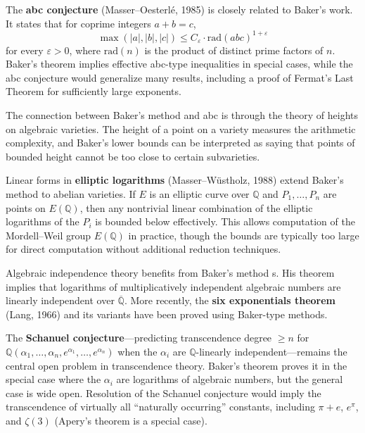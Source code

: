 The \textbf{abc conjecture} (Masser--Oesterl\'e, 1985) is closely related to Baker's work. It states that for coprime integers $a + b = c$,
\[
\max(|a|, |b|, |c|) \leq C_\varepsilon \cdot \text{rad}(abc)^{1+\varepsilon}
\]
for every $\varepsilon > 0$, where $\text{rad}(n)$ is the product of distinct prime factors of $n$. Baker's theorem implies effective abc-type inequalities in special cases, while the abc conjecture would generalize many results, including a proof of Fermat's Last Theorem for sufficiently large exponents.

The connection between Baker's method \cite{baker1966} and abc is through the theory of heights on algebraic varieties. The height of a point on a variety measures the arithmetic complexity, and Baker's lower bounds can be interpreted as saying that points of bounded height cannot be too close to certain subvarieties.

Linear forms in \textbf{elliptic logarithms} (Masser--W\"{u}stholz, 1988) extend Baker's method \cite{baker1966} to abelian varieties. If $E$ is an elliptic curve over $\mathbb{Q}$ and $P_1, \ldots, P_n$ are points on $E(\mathbb{Q})$, then any nontrivial linear combination of the elliptic logarithms of the $P_i$ is bounded below effectively. This allows computation of the Mordell--Weil group $E(\mathbb{Q})$ in practice, though the bounds are typically too large for direct computation without additional reduction techniques.

Algebraic independence theory benefits from Baker's method \cite{baker1966}s. His theorem implies that logarithms of multiplicatively independent algebraic numbers are linearly independent over $\overline{\mathbb{Q}}$. More recently, the \textbf{six exponentials theorem} (Lang, 1966) and its variants have been proved using Baker-type methods.

The \textbf{Schanuel conjecture}---predicting transcendence degree $\geq n$ for $\mathbb{Q}(\alpha_1, \ldots, \alpha_n, e^{\alpha_1}, \ldots, e^{\alpha_n})$ when the $\alpha_i$ are $\mathbb{Q}$-linearly independent---remains the central open problem in transcendence theory. Baker's theorem proves it in the special case where the $\alpha_i$ are logarithms of algebraic numbers, but the general case is wide open. Resolution of the Schanuel conjecture would imply the transcendence of virtually all ``naturally occurring'' constants, including $\pi + e$, $e^\pi$, and $\zeta(3)$ (Apery's theorem is a special case).

